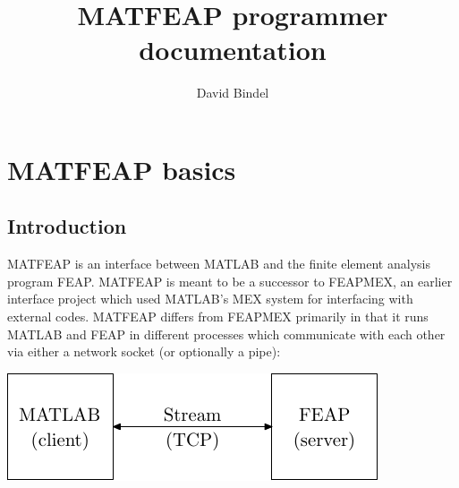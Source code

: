 \documentclass{report}
\title{MATFEAP programmer documentation}
\author{David Bindel}
\begin{document}
\maketitle
\tableofcontents


\chapter{MATFEAP basics}

\section{Introduction}

MATFEAP is an interface between MATLAB and the finite element analysis
program FEAP.  MATFEAP is meant to be a successor to FEAPMEX, an earlier
interface project which used MATLAB's MEX system for interfacing with
external codes.  MATFEAP differs from FEAPMEX primarily in that it runs
MATLAB and FEAP in different processes which communicate with each other
via either a network socket (or optionally a pipe):
\begin{center}
  \includegraphics{commfig}
\end{center}
\end{document}
